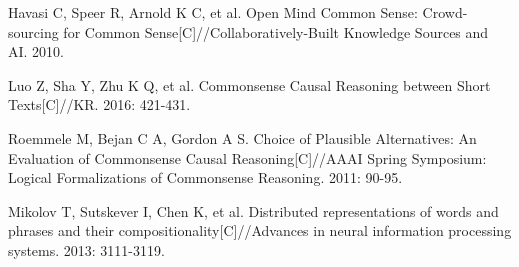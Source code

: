 \documentclass[conference]{IEEEtran}
\begin{document}
%
%
%
\begin{thebibliography}{1}

Havasi C, Speer R, Arnold K C, et al. Open Mind Common Sense: Crowd-sourcing for Common Sense[C]//Collaboratively-Built Knowledge Sources and AI. 2010.

Luo Z, Sha Y, Zhu K Q, et al. Commonsense Causal Reasoning between Short Texts[C]//KR. 2016: 421-431.

Roemmele M, Bejan C A, Gordon A S. Choice of Plausible Alternatives: An Evaluation of Commonsense Causal Reasoning[C]//AAAI Spring Symposium: Logical Formalizations of Commonsense Reasoning. 2011: 90-95.

Mikolov T, Sutskever I, Chen K, et al. Distributed representations of words and phrases and their compositionality[C]//Advances in neural information processing systems. 2013: 3111-3119.


\end{thebibliography}




\end{document}
